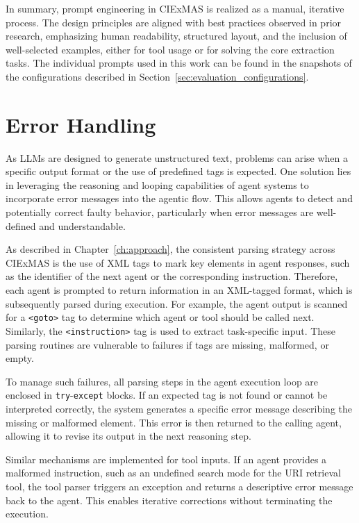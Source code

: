 \documentclass[a4paper,oneside,bibliography=totoc]{scrbook}
\begin{document}
In summary, prompt engineering in CIExMAS is realized as a manual, iterative process. The design principles are aligned with best practices observed in prior research, emphasizing human readability, structured layout, and the inclusion of well-selected examples, either for tool usage or for solving the core extraction tasks. The individual prompts used in this work can be found in the snapshots of the configurations described in Section~\ref{sec:evaluation_configurations}.

\section{Error Handling}
\label{sec:error_incorportion}

As \acp{LLM} are designed to generate unstructured text, problems can arise when a specific output format or the use of predefined tags is expected. One solution lies in leveraging the reasoning and looping capabilities of agent systems to incorporate error messages into the agentic flow. This allows agents to detect and potentially correct faulty behavior, particularly when error messages are well-defined and understandable.

As described in Chapter~\ref{ch:approach}, the consistent parsing strategy across CIExMAS is the use of XML tags to mark key elements in agent responses, such as the identifier of the next agent or the corresponding instruction. Therefore, each agent is prompted to return information in an XML-tagged format, which is subsequently parsed during execution. For example, the agent output is scanned for a \texttt{<goto>} tag to determine which agent or tool should be called next. Similarly, the \texttt{<instruction>} tag is used to extract task-specific input. These parsing routines are vulnerable to failures if tags are missing, malformed, or empty.

To manage such failures, all parsing steps in the agent execution loop are enclosed in \texttt{try}-\texttt{except} blocks. If an expected tag is not found or cannot be interpreted correctly, the system generates a specific error message describing the missing or malformed element. This error is then returned to the calling agent, allowing it to revise its output in the next reasoning step.

Similar mechanisms are implemented for tool inputs. If an agent provides a malformed instruction, such as an undefined search mode for the \ac{URI} retrieval tool, the tool parser triggers an exception and returns a descriptive error message back to the agent. This enables iterative corrections without terminating the execution.
\end{document}
